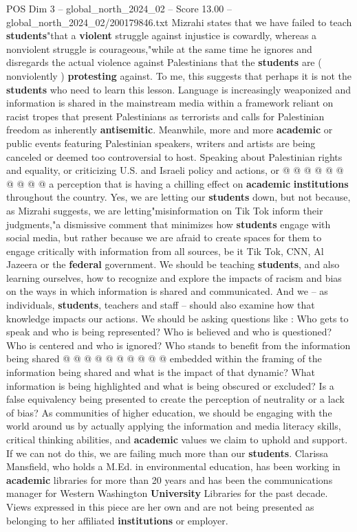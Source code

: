 \begin{textsample}{POS Dim 3 – global\_north\_2024\_02 – Score 13.00 – global\_north\_2024\_02/200179846.txt}
Mizrahi states that we have failed to teach \textbf{students}"that a \textbf{violent} struggle against injustice is cowardly, whereas a nonviolent struggle is courageous,"while at the same time he ignores and disregards the actual violence against Palestinians that the \textbf{students} are ( nonviolently ) \textbf{protesting} against.
To me, this suggests that perhaps it is not the \textbf{students} who need to learn this lesson.
Language is increasingly weaponized and information is shared in the mainstream media within a framework reliant on racist tropes that present Palestinians as terrorists and calls for Palestinian freedom as inherently \textbf{antisemitic}.
Meanwhile, more and more \textbf{academic} or public events featuring Palestinian speakers, writers and artists are being canceled or deemed too controversial to host.
Speaking about Palestinian rights and equality, or criticizing U.S. and Israeli policy and actions, or @ @ @ @ @ @ @ @ @ @ a perception that is having a chilling effect on \textbf{academic} \textbf{institutions} throughout the country.
Yes, we are letting our \textbf{students} down, but not because, as Mizrahi suggests, we are letting"misinformation on Tik Tok inform their judgments,"a dismissive comment that minimizes how \textbf{students} engage with social media, but rather because we are afraid to create spaces for them to engage critically with information from all sources, be it Tik Tok, CNN, Al Jazeera or the \textbf{federal} government.
We should be teaching \textbf{students}, and also learning ourselves, how to recognize and explore the impacts of racism and bias on the ways in which information is shared and communicated.
And we -- as individuals, \textbf{students}, teachers and staff -- should also examine how that knowledge impacts our actions.
We should be asking questions like : Who gets to speak and who is being represented?
Who is believed and who is questioned?
Who is centered and who is ignored?
Who stands to benefit from the information being shared @ @ @ @ @ @ @ @ @ @ embedded within the framing of the information being shared and what is the impact of that dynamic?
What information is being highlighted and what is being obscured or excluded?
Is a false equivalency being presented to create the perception of neutrality or a lack of bias?
As communities of higher education, we should be engaging with the world around us by actually applying the information and media literacy skills, critical thinking abilities, and \textbf{academic} values we claim to uphold and support.
If we can not do this, we are failing much more than our \textbf{students}.
Clarissa Mansfield, who holds a M.Ed. in environmental education, has been working in \textbf{academic} libraries for more than 20 years and has been the communications manager for Western Washington \textbf{University} Libraries for the past decade.
Views expressed in this piece are her own and are not being presented as belonging to her affiliated \textbf{institutions} or employer.

\end{textsample}
